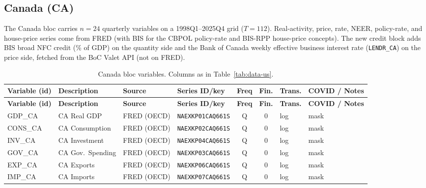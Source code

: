 \subsection{Canada (CA)}\label{sec:data-ca}

The Canada bloc carries $n=24$ quarterly variables on a 1998Q1--2025Q4
grid ($T=112$). Real-activity, price, rate, NEER, policy-rate, and
house-price series come from FRED (with BIS for the CBPOL policy-rate and
BIS-RPP house-price concepts). The new credit block adds BIS broad NFC
credit (\% of GDP) on the quantity side and the Bank of Canada weekly
effective business interest rate (\texttt{LENDR\_CA}) on the price side,
fetched from the BoC Valet API (not on FRED).

{\footnotesize\setlength{\tabcolsep}{3.5pt}
\begin{longtable}{@{}>{\raggedright\arraybackslash}p{1.7cm} >{\raggedright\arraybackslash}p{2.7cm} >{\raggedright\arraybackslash}p{1.35cm} >{\raggedright\arraybackslash}p{2.55cm} c c >{\raggedright\arraybackslash}p{0.85cm} >{\raggedright\arraybackslash}p{2.75cm}@{}}
\caption{Canada bloc variables. Columns as in
Table~\ref{tab:data-us}.}\label{tab:data-ca}\\
\toprule
\textbf{Variable (id)} & \textbf{Description} & \textbf{Source} & \textbf{Series ID/key} & \textbf{Freq} & \textbf{Fin.} & \textbf{Trans.} & \textbf{COVID / Notes} \\
\midrule
\endfirsthead
\toprule
\textbf{Variable (id)} & \textbf{Description} & \textbf{Source} & \textbf{Series ID/key} & \textbf{Freq} & \textbf{Fin.} & \textbf{Trans.} & \textbf{COVID / Notes} \\
\midrule
\endhead
\bottomrule
\endfoot
GDP\_CA     & CA Real GDP & FRED (OECD) & \texttt{NAEXKP01CAQ661S} & Q & 0 & log & mask \\
CONS\_CA    & CA Consumption & FRED (OECD) & \texttt{NAEXKP02CAQ661S} & Q & 0 & log & mask \\
INV\_CA     & CA Investment & FRED (OECD) & \texttt{NAEXKP04CAQ661S} & Q & 0 & log & mask \\
GOV\_CA     & CA Gov.\ Spending & FRED (OECD) & \texttt{NAEXKP03CAQ661S} & Q & 0 & log & mask \\
EXP\_CA     & CA Exports & FRED (OECD) & \texttt{NAEXKP06CAQ661S} & Q & 0 & log & mask \\
IMP\_CA     & CA Imports & FRED (OECD) & \texttt{NAEXKP07CAQ661S} & Q & 0 & log & mask \\

\end{longtable}}
